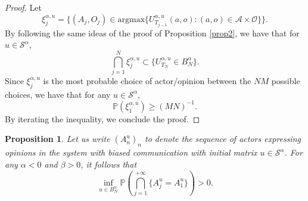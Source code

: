 \documentclass[11pt]{article}
\newtheorem{proposition}[theorem]{Proposition}
\theoremstyle{definition}
\newcommand{\st}{\mathcal{S}}
\newcommand{\A}{\mathcal{A}}
\newcommand{\opn}{\mathcal{O}}
\def\P{{\mathbb P}}
\begin{document}
\begin{proof}
Let
$$
    \xi_j^{\alpha,u}=\{(A_j,O_j) \in \text{argmax}\{U_{T_{j-1}}^{\alpha, u}(a,o):(a,o)\in \A\times \opn\}\}.
$$
By following the same ideas of the proof of Proposition \ref{prop2}, we have that for $u \in \st^{\alpha}$,
$$
\bigcap_{j=1}^{N}\xi_j^{\alpha,u}\subset \{U_{T_N}^{\alpha,u} \in B_N^{\alpha}\}.
$$
Since $\xi_j^{\alpha,u}$ is the most probable choice of actor/opinion between the $NM$ possible choices, we have that for any $u\in \st^{\alpha}$,
$$
\P(\xi_1^{\alpha,u})\geq (MN)^{-1}.
$$
By iterating the inequality, we conclude the proof.
\end{proof}

\begin{proposition} \label{prop2_teo4} Let us write $(A_n^u)_n$ to denote the sequence of actors expressing opinions in the system with biased communication with initial matrix $u\in \st^{\alpha}$. For any $\alpha <0$ and $\beta >0$, it follows that
$$
\inf_{u \in B_N^{\alpha}}\P\left( \bigcap_{j=1}^{+\infty}\{A^u_j=A^u_1\}\right)>0.
$$
\end{proposition}
\end{document}
